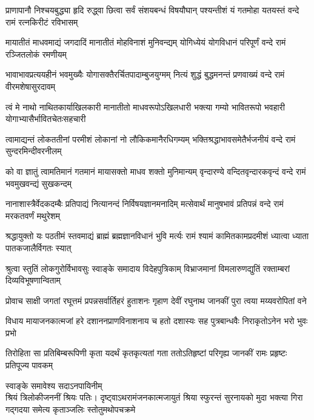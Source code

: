 \fourlineindentedshloka
{प्राणापानौ निश्चयबुद्ध्या हृदि रुद्ध्वा}
{छित्वा सर्वं संशयबन्धं विषयौघान्}
{पश्यन्तीशं यं गतमोहा यतयस्तं}
{वन्दे रामं रत्नकिरीटं रविभासम्} %

\fourlineindentedshloka
{मायातीतं माधवमाद्यं जगदादिं}
{मानातीतं मोहविनाशं मुनिवन्द्यम्}
{योगिध्येयं योगविधानं परिपूर्णं}
{वन्दे रामं रञ्जितलोकं रमणीयम्} %

\fourlineindentedshloka
{भावाभावप्रत्ययहीनं भवमुख्यैः}
{योगासक्तैरर्चितपादाम्बुजयुग्मम्}
{नित्यं शुद्धं बुद्धमनन्तं प्रणवाख्यं}
{वन्दे रामं वीरमशेषासुरदावम्} %

\fourlineindentedshloka
{त्वं मे नाथो नाथितकार्याखिलकारी}
{मानातीतो माधवरूपोऽखिलधारी}
{भक्त्या गम्यो भावितरूपो भवहारी}
{योगाभ्यासैर्भावितचेतःसहचारी} %

\fourlineindentedshloka
{त्वामाद्यन्तं लोकततीनां परमीशं}
{लोकानां नो लौकिकमानैरधिगम्यम्}
{भक्तिश्रद्धाभावसमेतैर्भजनीयं}
{वन्दे रामं सुन्दरमिन्दीवरनीलम्} %

\fourlineindentedshloka
{को वा ज्ञातुं त्वामतिमानं गतमानं}
{मायासक्तो माधव शक्तो मुनिमान्यम्}
{वृन्दारण्ये वन्दितवृन्दारकवृन्दं}
{वन्दे रामं भवमुखवन्द्यं सुखकन्दम्} %

\fourlineindentedshloka
{नानाशास्त्रैर्वेदकदम्बैः प्रतिपाद्यं}
{नित्यानन्दं निर्विषयज्ञानमनादिम्}
{मत्सेवार्थं मानुषभावं प्रतिपन्नं}
{वन्दे रामं मरकतवर्णं मथुरेशम्} %

\fourlineindentedshloka
{श्रद्धायुक्तो यः पठतीमं स्तवमाद्यं}
{ब्राह्मं ब्रह्मज्ञानविधानं भुवि मर्त्यः}
{रामं श्यामं कामितकामप्रदमीशं}
{ध्यात्वा ध्याता पातकजालैर्विगतः स्यात्} %

\fourlineindentedshloka
{श्रुत्वा स्तुतिं लोकगुरोर्विभावसुः}
{स्वाङ्के समादाय विदेहपुत्रिकाम्}
{विभ्राजमानां विमलारुणद्युतिं}
{रक्ताम्बरां दिव्यविभूषणान्विताम्} %

\fourlineindentedshloka
{प्रोवाच साक्षी जगतां रघूत्तमं}
{प्रपन्नसर्वार्तिहरं हुताशनः}
{गृहाण देवीं रघुनाथ जानकीं}
{पुरा त्वया मय्यवरोपितां वने} %

\fourlineindentedshloka
{विधाय मायाजनकात्मजां हरे}
{दशाननप्राणविनाशनाय च}
{हतो दशास्यः सह पुत्रबान्धवैः}
{निराकृतोऽनेन भरो भुवः प्रभो} %

\fourlineindentedshloka
{तिरोहिता सा प्रतिबिम्बरूपिणी}
{कृता यदर्थं कृतकृत्यतां गता}
{ततोऽतिहृष्टां परिगृह्य जानकीं}
{रामः प्रहृष्टः प्रतिपूज्य पावकम्} %

\begin{minipage}{\linewidth}
\centering%
{\hspace{-7ex}स्वाङ्के समावेश्य सदाऽनपायिनीम्}\\
{\hspace{-1ex}श्रियं त्रिलोकीजननीं श्रियः पतिः।}
\fourlineindentedshloka
{दृष्ट्वाऽथ\hspace{1.3ex}रामं\hspace{1.3ex}जनकात्मजायुतं}
{श्रिया स्फुरन्तं सुरनायको मुदा}
{भक्त्या गिरा गद्गदया समेत्य}
{कृताञ्जलिः \hspace{1.5ex}स्तोतुमथोपचक्रमे} %
\end{minipage}

